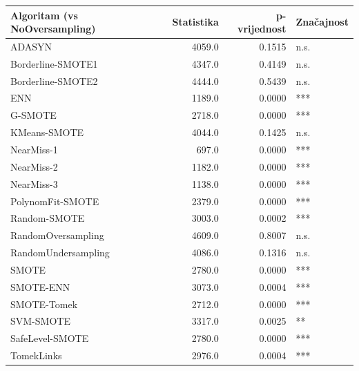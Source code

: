 \begin{tabular}{lrrl}
\toprule
Algoritam (vs NoOversampling) & Statistika & p-vrijednost & Značajnost \\
\midrule
ADASYN & 4059.0 & 0.1515 & n.s. \\
Borderline-SMOTE1 & 4347.0 & 0.4149 & n.s. \\
Borderline-SMOTE2 & 4444.0 & 0.5439 & n.s. \\
ENN & 1189.0 & 0.0000 & *** \\
G-SMOTE & 2718.0 & 0.0000 & *** \\
KMeans-SMOTE & 4044.0 & 0.1425 & n.s. \\
NearMiss-1 & 697.0 & 0.0000 & *** \\
NearMiss-2 & 1182.0 & 0.0000 & *** \\
NearMiss-3 & 1138.0 & 0.0000 & *** \\
PolynomFit-SMOTE & 2379.0 & 0.0000 & *** \\
Random-SMOTE & 3003.0 & 0.0002 & *** \\
RandomOversampling & 4609.0 & 0.8007 & n.s. \\
RandomUndersampling & 4086.0 & 0.1316 & n.s. \\
SMOTE & 2780.0 & 0.0000 & *** \\
SMOTE-ENN & 3073.0 & 0.0004 & *** \\
SMOTE-Tomek & 2712.0 & 0.0000 & *** \\
SVM-SMOTE & 3317.0 & 0.0025 & ** \\
SafeLevel-SMOTE & 2780.0 & 0.0000 & *** \\
TomekLinks & 2976.0 & 0.0004 & *** \\
\bottomrule
\end{tabular}
